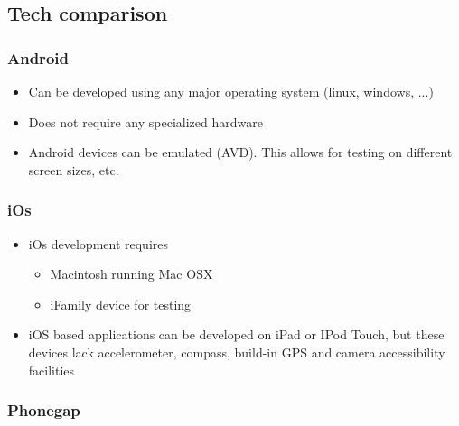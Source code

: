 \subsection{Tech comparison}

\subsubsection{Android}

\begin{itemize}
	\item Can be developed using any major operating system (linux, windows, ...)
	\item Does not require any specialized hardware
	\item Android devices can be emulated (AVD). This allows for testing
		on different screen sizes, etc.
\end{itemize}

\subsubsection{iOs}

\begin{itemize}
	\item iOs development requires
		\begin{itemize}
			\item Macintosh running Mac OSX
			\item iFamily device for testing
		\end{itemize}
	\item iOS based applications can be developed on iPad or IPod Touch, 
		but these devices lack accelerometer, compass, build-in GPS and 
		camera accessibility facilities
\end{itemize}

\subsubsection{Phonegap}
